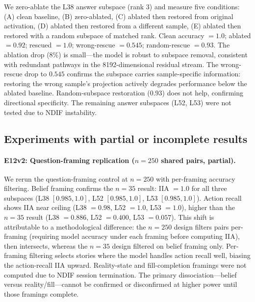 \documentclass{article}
\begin{document}
We zero-ablate the L38 answer subspace (rank 3) and measure five conditions: (A) clean baseline, (B) zero-ablated, (C) ablated then restored from original activation, (D) ablated then restored from a different sample, (E) ablated then restored with a random subspace of matched rank. Clean accuracy $= 1.0$; ablated $= 0.92$; rescued $= 1.0$; wrong-rescue $= 0.545$; random-rescue $= 0.93$. The ablation drop (8\%) is small---the model is robust to subspace removal, consistent with redundant pathways in the 8192-dimensional residual stream. The wrong-rescue drop to $0.545$ confirms the subspace carries sample-specific information: restoring the wrong sample's projection actively degrades performance below the ablated baseline. Random-subspace restoration ($0.93$) does not help, confirming directional specificity. The remaining answer subspaces (L52, L53) were not tested due to NDIF instability.

\subsection{Experiments with partial or incomplete results}

\paragraph{E12v2: Question-framing replication ($n = 250$ shared pairs, partial).}
We rerun the question-framing control at $n = 250$ with per-framing accuracy filtering. Belief framing confirms the $n = 35$ result: IIA $= 1.0$ for all three subspaces (L38 $[0.985, 1.0]$, L52 $[0.985, 1.0]$, L53 $[0.985, 1.0]$). Action recall shows IIA near ceiling (L38 $= 0.98$, L52 $= 1.0$, L53 $= 1.0$), higher than the $n = 35$ result (L38 $= 0.886$, L52 $= 0.400$, L53 $= 0.057$). This shift is attributable to a methodological difference: the $n = 250$ design filters pairs per-framing (requiring model accuracy under each framing before computing IIA), then intersects, whereas the $n = 35$ design filtered on belief framing only. Per-framing filtering selects stories where the model handles action recall well, biasing the action-recall IIA upward. Reality-state and fill-completion framings were not computed due to NDIF session termination. The primary dissociation---belief versus reality/fill---cannot be confirmed or disconfirmed at higher power until those framings complete.
\end{document}
